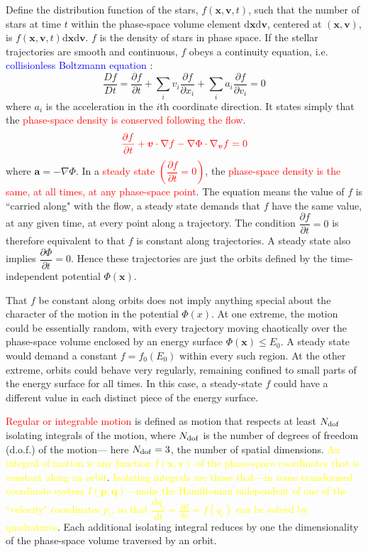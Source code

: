 \documentclass[12pt,a4paper]{article}
\renewcommand{\vec}[1]{\boldsymbol{#1}}
\newcommand{\dif}{\mathrm{d}}
\begin{document}
Define the distribution function of the stars, $f(\vec{x}, \vec{v}, t)$, such that the number of stars at time $t$ within the phase-space volume element $\dif \vec{x} \dif \vec{v}$, centered at $(\vec{x}, \vec{v})$, is $f(\vec{x}, \vec{v}, t) \dif \vec{x} \dif \vec{v}$. $f$ is the density of stars in phase space. If the stellar trajectories are smooth and continuous, $f$ obeys a continuity equation, i.e. \textcolor{blue}{collisionless Boltzmann equation} :
\begin{equation}
\frac{D f}{D t} = \frac{\partial f}{\partial t} +\sum_i v_i \frac{\partial f}{\partial x_i} +\sum_i a_i \frac{\partial f}{\partial v_i} = 0
\end{equation}
where $a_i$ is the acceleration in the $i$th coordinate direction. It states simply that the \textcolor{red}{phase-space density is conserved following the flow}.
\begin{equation}
\color{red} \frac{\partial f}{\partial t} +\vec{v} \cdot\nabla f -\nabla \Phi\cdot \nabla_{\vec{v}} f = 0
\end{equation}
where $\vec{a} = -\nabla \Phi$.
In a  \textcolor{red}{steady state $(\dfrac{\partial f}{\partial t} = 0)$}, the \textcolor{red}{phase-space density is the same, at all times, at any phase-space point}. The equation means the value of $f$ is ``carried along" with the flow, a steady state demands that $f$ have the same value, at any given time, at every point along a trajectory. The condition $\dfrac{\partial f}{\partial t} = 0$ is therefore equivalent to that $f$ is constant along trajectories. A steady state also implies $\dfrac{\partial \Phi}{\partial t} = 0$. Hence these trajectories are just the orbits defined by the time- independent potential $\Phi(\vec{x})$.

That $f$ be constant along orbits does not imply anything special about the character of the motion in the potential $\Phi(x)$. At one extreme, the motion could be essentially random, with every trajectory moving chaotically over the phase-space volume enclosed by an energy surface  $\Phi(\vec{x}) \leqslant E_0$. A steady state would demand a constant $f = f_0(E_0)$ within every such region. At the other extreme, orbits could behave very regularly, remaining confined to small parts of the energy surface for all times. In this case, a steady-state $f$ could have a different value in each distinct piece of the energy surface.

\textcolor{red}{Regular or integrable motion} is defined as motion that respects at least $N_{\rm dof}$ isolating integrals of the motion, where $N_{\rm dof}$ is the number of degrees of freedom (d.o.f.) of the motion--- here $N_{\rm dof} = 3$, the number of spatial dimensions. \textcolor{yellow}{An integral of motion is any function $I(\vec{x}, \vec{v})$ of the phase-space coordinates that is constant along an orbit}. \textcolor{yellow}{Isolating integrals are those that---in some transformed coordinate system $I(\vec{p}, \vec{q})$---make the Hamiltonian independent of one of the ``velocity" coordinates $p_i$, so that $\dfrac{\dif q_i}{\dif t} = \frac{\partial H}{\partial p_i} = f(q_i)$ can be solved by quadratures}. Each additional isolating integral reduces by one the dimensionality of the phase-space volume traversed by an orbit.
\end{document}
